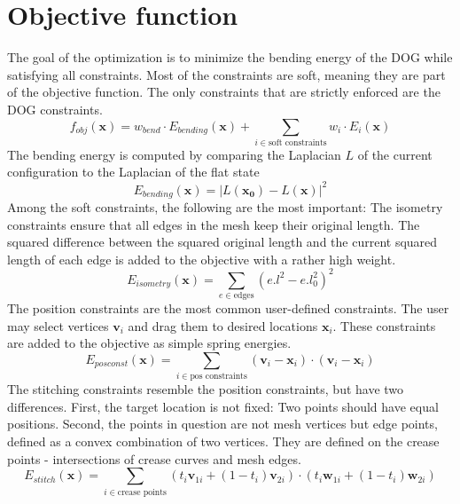 \documentclass[a4paper,twoside,12pt,nochapterprefix]{scrbook}
\begin{document}
\section{Objective function}\label{sec:objective}
The goal of the optimization is to minimize the bending energy of the DOG while satisfying all constraints. Most of the constraints are soft, meaning they are part of the objective function. The only constraints that are strictly enforced are the DOG constraints.
\begin{equation}
f_{obj}(\mathbf{x}) = w_{bend} \cdot E_{bending}(\mathbf{x}) + \sum_{i \in \mbox{soft constraints}} w_i \cdot E_i(\mathbf{x})
\end{equation}
The bending energy is computed by comparing the Laplacian $L$ of the current configuration to the Laplacian of the flat state
\begin{equation}
E_{bending}(\mathbf{x}) = |L(\mathbf{x_0}) - L(\mathbf{x})|^2
\end{equation}
Among the soft constraints, the following are the most important:\newline
The isometry constraints ensure that all edges in the mesh keep their original length. The squared difference between the squared original length and the current squared length of each edge is added to the objective with a rather high weight.
\begin{equation}
E_{isometry}(\mathbf{x}) = \sum_{e \in \mbox{edges}} (e.l^2 - e.l_0^2)^2
\end{equation}
The position constraints are the most common user-defined constraints. The user may select vertices $\mathbf{v}_i$ and drag them to desired locations $\mathbf{x}_i$. These constraints are added to the objective as simple spring energies.
\begin{equation}
E_{posconst}(\mathbf{x}) = \sum_{i \in \mbox{pos constraints}} (\mathbf{v}_i - \mathbf{x}_i) \cdot (\mathbf{v}_i - \mathbf{x}_i)
\end{equation}
The stitching constraints resemble the position constraints, but have two differences. First, the target location is not fixed: Two points should have equal positions. Second, the points in question are not mesh vertices but edge points, defined as a convex combination of two vertices. They are defined on the crease points - intersections of crease curves and mesh edges.
\begin{equation}
E_{stitch}(\mathbf{x}) = \sum_{i \in \mbox{crease points}} (t_i\mathbf{v}_{1i} + (1-t_i)\mathbf{v}_{2i}) \cdot (t_i\mathbf{w}_{1i} + (1-t_i)\mathbf{w}_{2i})
\end{equation}
\end{document}
